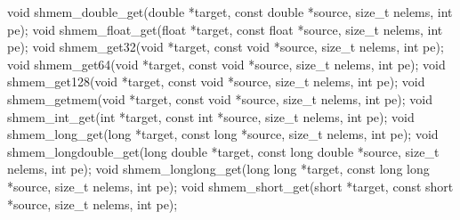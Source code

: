 \synC   %

 void shmem_double_get(double *target, const double  *source, size_t nelems, int pe);
 void shmem_float_get(float *target, const float *source, size_t nelems, int pe);
 void shmem_get32(void *target, const void *source, size_t  nelems,  int pe);
 void shmem_get64(void  *target, const void *source, size_t nelems, int pe);
 void shmem_get128(void *target, const void *source, size_t nelems,  int pe);
 void shmem_getmem(void *target, const void *source, size_t nelems, int pe);
 void shmem_int_get(int *target, const int *source, size_t  nelems,  int pe);
 void shmem_long_get(long  *target,  const long *source, size_t nelems, int pe);
 void shmem_longdouble_get(long double	 *target,  const  long	double *source, size_t nelems, int pe);
 void shmem_longlong_get(long long *target, const long long *source, size_t nelems, int pe);
 void shmem_short_get(short *target, const short *source, size_t nelems, int pe);
\synF   %

